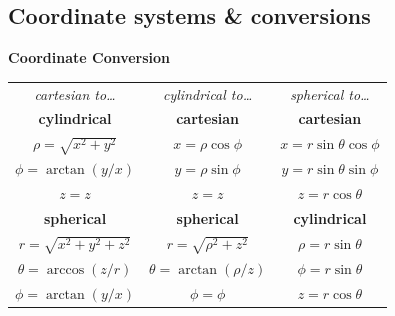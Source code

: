 \documentclass[letterpaper,landscape,10pt]{article}
\begin{document}
{\begin{multicols}{4}
	\subsection*{Coordinate systems \& conversions}
	\begin{center}
	\begin{minipage}{\columnwidth}
	  \centering \textbf{Coordinate Conversion}\\
	  \vspace{2.5pt}
	\begin{tabular}{ c !{\color{black}\vline} c !{\color{black}\vline} c }
		\setlength\arrayrulewidth{1pt}
		\textit{cartesian to\dots} & \textit{cylindrical to\dots} &
			\textit{spherical to\dots} \\
		\textbf{cylindrical}    & \textbf{cartesian} & \textbf{cartesian} \\
		$\rho=\sqrt{x^2+y^2}$ & $x=\rho\cos\phi$ & $x=r\sin\theta\cos\phi$ \\
		$\phi=\arctan(y/x)$    & $y=\rho\sin\phi$ & $y=r\sin\theta\sin\phi$ \\
		$z = z$               & $z=z$            & $z=r\cos\theta$\\
		\textbf{spherical}      & \textbf{spherical} & \textbf{cylindrical} \\
		$r=\sqrt{x^2+y^2+z^2}$& $r=\sqrt{\rho^2+z^2}$&$\rho=r\sin\theta$ \\
		$\theta=\arccos(z/r)$  & $\theta=\arctan(\rho/z)$&$\phi=r\sin\theta$ \\
		$\phi=\arctan(y/x)$    & $\phi=\phi$      & $z=r\cos\theta$ \\
	\end{tabular}
    \end{minipage}
	\vspace{5pt}\\


\end{center}
\end{multicols}}
\end{document}
